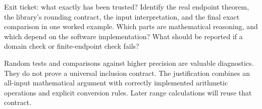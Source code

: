 \begin{question}{Exit ticket: what exactly has been trusted?}
Identify the real endpoint theorem, the library's rounding contract, the input
interpretation, and the final exact comparison in one worked example. Which
parts are mathematical reasoning, and which depend on the software implementation?
What should be reported if a domain check or finite-endpoint check fails?
\end{question}
Random tests and comparisons against higher precision are valuable diagnostics.
They do not prove a universal inclusion contract. The justification combines an
all-input mathematical argument with correctly implemented arithmetic operations
and explicit conversion rules. Later range calculations will reuse that contract.


